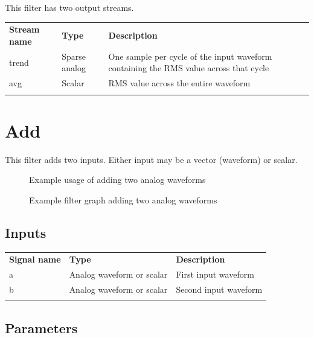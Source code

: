 This filter has two output streams.

\begin{tabularx}{16cm}{llX}
\thickhline
\textbf{Stream name} & \textbf{Type} & \textbf{Description} \\
\thickhline
trend & Sparse analog & One sample per cycle of the input waveform containing the RMS value across that cycle \\
\thinhline
avg & Scalar & RMS value across the entire waveform \\
\thickhline
\end{tabularx}

\pagebreak
\section{Add}
\label{filter:add}

This filter adds two inputs. Either input may be a vector (waveform) or scalar.

\begin{figure}[h]
\centering
{}
\caption{Example usage of adding two analog waveforms}
\label{filter_add}
\end{figure}

\begin{figure}[h]
\centering
{}
\caption{Example filter graph adding two analog waveforms}
\label{filter_graph_add}
\end{figure}
\FloatBarrier
\subsection{Inputs}

\begin{tabularx}{16cm}{llX}
\thickhline
\textbf{Signal name} & \textbf{Type} & \textbf{Description} \\
\thickhline
a & Analog waveform or scalar & First input waveform\\
\thinhline
b & Analog waveform or scalar & Second input waveform\\
\thickhline
\end{tabularx}

\subsection{Parameters}


